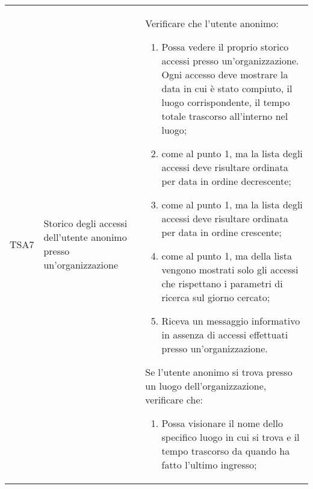 {\begin{longtable}{ c  C{3cm}  C{11cm} }
TSA7 & Storico degli accessi dell'utente anonimo presso un'organizzazione & 
Verificare che l'utente anonimo:
\begin{enumerate}
    \item Possa vedere il proprio storico accessi presso un'organizzazione. Ogni accesso deve mostrare la data in cui è stato compiuto, il luogo corrispondente, il tempo totale trascorso all'interno nel luogo;
    \item come al punto 1, ma la lista degli accessi deve risultare ordinata per data in ordine decrescente;
    \item come al punto 1, ma la lista degli accessi deve risultare ordinata per data in ordine crescente;
    \item come al punto 1, ma della lista vengono mostrati solo gli accessi che rispettano i parametri di ricerca sul giorno cercato;
    \item Riceva un messaggio informativo in assenza di accessi effettuati presso un'organizzazione.
\end{enumerate}
Se l'utente anonimo si trova presso un luogo dell'organizzazione, verificare che:
\begin{enumerate}
    \item Possa visionare il nome dello specifico luogo in cui si trova e il tempo trascorso da quando ha fatto l'ultimo ingresso;
\end{enumerate} \\


\end{longtable}}
